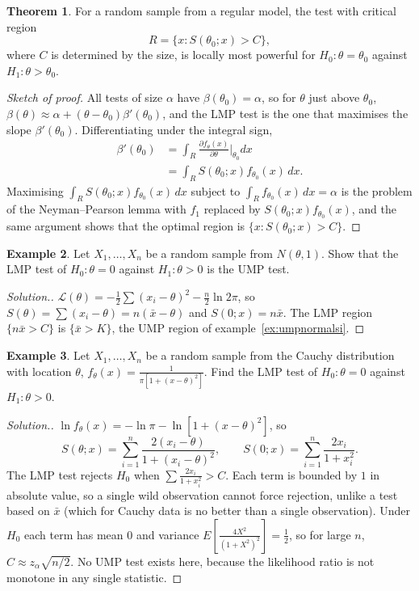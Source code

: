\documentclass[12pt,a4paper]{report}
\theoremstyle{definition}
\newtheorem{thm}{Theorem}[section]
\newtheorem{exa}[thm]{Example}
\newenvironment{solution}
  {\renewcommand{\qedsymbol}{}\begin{proof}[\textit{Solution}.]}
  {\end{proof}}
\begin{document}
\begin{thm}
\label{thm:lmp}
For a random sample from a regular model, the test with critical region
\[R = \{x : S(\theta_0; x)>C\},\]
where $C$ is determined by the size, is locally most powerful for $H_0\colon\theta = \theta_0$
against $H_1\colon\theta>\theta_0$.
\end{thm}

\begin{proof}[Sketch of proof]
All tests of size $\alpha$ have $\beta(\theta_0) = \alpha$, so for $\theta$ just above $\theta_0$,
$\beta(\theta)\approx\alpha + (\theta - \theta_0)\beta'(\theta_0)$, and the LMP test is the one that
maximises the slope $\beta'(\theta_0)$. Differentiating under the integral sign,
\begin{align*}
\beta'(\theta_0) &= \int_R\frac{\partial f_\theta(x)}{\partial\theta}\Big|_{\theta_0}dx\\
&= \int_R S(\theta_0; x)f_{\theta_0}(x)\,dx .
\end{align*}
Maximising $\int_R S(\theta_0; x)f_{\theta_0}(x)\,dx$ subject to $\int_Rf_{\theta_0}(x)\,dx = \alpha$ is the
problem of the Neyman--Pearson lemma with $f_1$ replaced by $S(\theta_0; x)f_{\theta_0}(x)$, and the
same argument shows that the optimal region is $\{x : S(\theta_0; x)>C\}$.
\end{proof}

\begin{exa}
\label{ex:lmpnormal}
Let $X_1, \dots, X_n$ be a random sample from $N(\theta, 1)$. Show that the LMP test of
$H_0\colon\theta = 0$ against $H_1\colon\theta>0$ is the UMP test.
\end{exa}

\begin{solution}
$\mathcal{L}(\theta) = -\frac12\sum(x_i - \theta)^2 - \frac n2\ln 2\pi$, so
$S(\theta) = \sum(x_i - \theta) = n(\bar x - \theta)$ and $S(0; x) = n\bar x$. The LMP region
$\{n\bar x>C\}$ is $\{\bar x>K\}$, the UMP region of example~\ref{ex:umpnormalsi}.
\end{solution}

\begin{exa}
\label{ex:lmpcauchy}
Let $X_1, \dots, X_n$ be a random sample from the Cauchy distribution with location
$\theta$, $f_\theta(x) = \frac{1}{\pi[1 + (x - \theta)^2]}$. Find the LMP test of $H_0\colon\theta = 0$
against $H_1\colon\theta>0$.
\end{exa}

\begin{solution}
$\ln f_\theta(x) = -\ln\pi - \ln\left[1 + (x - \theta)^2\right]$, so
\[S(\theta; x) = \sum_{i=1}^n\frac{2(x_i - \theta)}{1 + (x_i - \theta)^2},\qquad
S(0; x) = \sum_{i=1}^n\frac{2x_i}{1 + x_i^2} .\]
The LMP test rejects $H_0$ when $\sum\frac{2x_i}{1 + x_i^2}>C$. Each term is bounded by
$1$ in absolute value, so a single wild observation cannot force rejection, unlike a
test based on $\bar x$ (which for Cauchy data is no better than a single observation).
Under $H_0$ each term has mean $0$ and variance $E\left[\frac{4X^2}{(1 + X^2)^2}\right] = \frac12$,
so for large $n$, $C\approx z_\alpha\sqrt{n/2}$. No UMP test exists here, because the
likelihood ratio is not monotone in any single statistic.
\end{solution}
\end{document}
